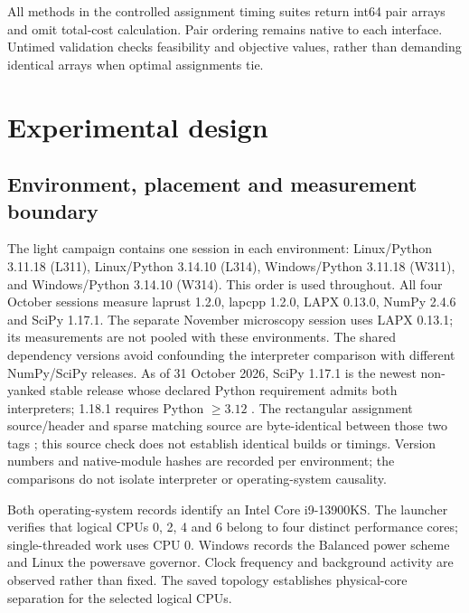 \documentclass[11pt,a4paper]{article}
\begin{document}
All methods in the controlled assignment timing suites return int64 pair arrays and omit total-cost calculation. Pair ordering remains native to each interface. Untimed validation checks feasibility and objective values, rather than demanding identical arrays when optimal assignments tie.

\FloatBarrier
\section{Experimental design}\label{sec:design}

\subsection{Environment, placement and measurement boundary}

The light campaign contains one session in each environment: Linux/Python 3.11.18 (L311), Linux/Python 3.14.10 (L314), Windows/Python 3.11.18 (W311), and Windows/Python 3.14.10 (W314). This order is used throughout. All four October sessions measure laprust 1.2.0, lapcpp 1.2.0, LAPX 0.13.0, NumPy 2.4.6 and SciPy 1.17.1. The separate November microscopy session uses LAPX 0.13.1; its measurements are not pooled with these environments. The shared dependency versions avoid confounding the interpreter comparison with different NumPy/SciPy releases. As of 31 October 2026, SciPy 1.17.1 is the newest non-yanked stable release whose declared Python requirement admits both interpreters; 1.18.1 requires Python $\geq3.12$ \cite{scipyversions2026}. The rectangular assignment source/header and sparse matching source are byte-identical between those two tags \cite{scipysource2026}; this source check does not establish identical builds or timings. Version numbers and native-module hashes are recorded per environment; the comparisons do not isolate interpreter or operating-system causality.

Both operating-system records identify an Intel Core i9-13900KS. The launcher verifies that logical CPUs 0, 2, 4 and 6 belong to four distinct performance cores; single-threaded work uses CPU 0. Windows records the Balanced power scheme and Linux the powersave governor. Clock frequency and background activity are observed rather than fixed. The saved topology establishes physical-core separation for the selected logical CPUs.
\end{document}
